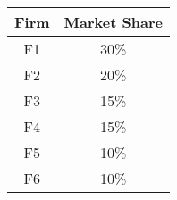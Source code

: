 \begin{tabular}{|c|c|}
\hline
Firm & Market Share \\
\hline
F1 & 30\% \\
F2 & 20\% \\
F3 & 15\% \\
F4 & 15\% \\
F5 & 10\% \\
F6 & 10\% \\
\hline
\end{tabular}